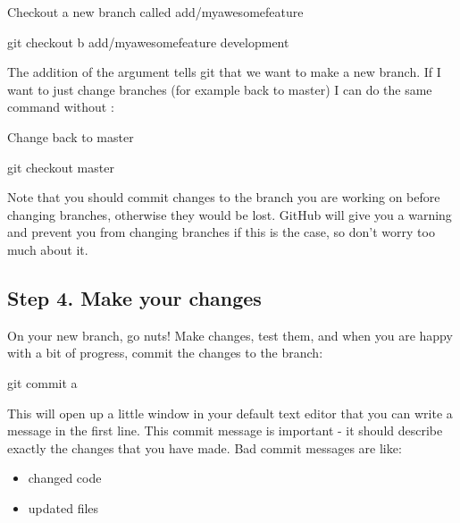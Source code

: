 \documentclass[letterpaper,10pt,english]{sphinxmanual}
\begin{document}
%
\begin{sphinxVerbatim}[commandchars=\\\{\}]
\PYGZsh{} Checkout a new branch called add/my\PYGZhy{}awesome\PYGZhy{}feature

git checkout \PYGZhy{}b add/my\PYGZhy{}awesome\PYGZhy{}feature development
\end{sphinxVerbatim}

The addition of the  argument tells git that we want to make a new branch. If I want to just change branches (for example back to master) I can do the same command without :

%
\begin{sphinxVerbatim}[commandchars=\\\{\}]
\PYGZsh{} Change back to master

git checkout master
\end{sphinxVerbatim}

Note that you should commit changes to the branch you are working on before changing branches, otherwise they would be lost. GitHub will give you a warning and prevent you from changing branches if this is the case, so don’t worry too much about it.


\subsection{Step 4. Make your changes}
\label{\detokenize{contributing:step-4-make-your-changes}}
On your new branch, go nuts! Make changes, test them, and when you are happy with a bit of progress, commit the changes to the branch:

%
\begin{sphinxVerbatim}[commandchars=\\\{\}]
git commit \PYGZhy{}a
\end{sphinxVerbatim}

This will open up a little window in your default text editor that you can write a message in the first line. This commit message is important - it should describe exactly the changes that you have made. Bad commit messages are like:
\begin{itemize}
\item {} 
changed code

\item {} 
updated files

\end{itemize}
\end{document}
